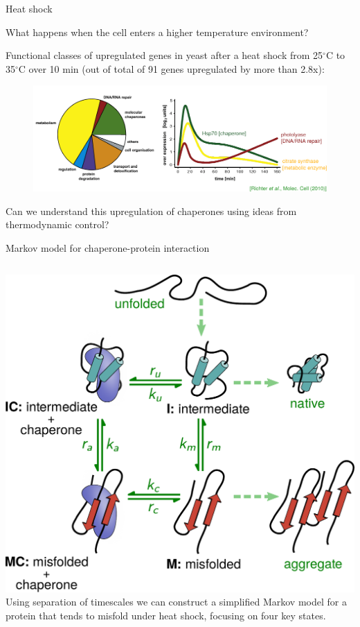 \documentclass{beamer}
\begin{document}
\begin{frame}{Heat shock}

  {What happens when the cell enters a higher temperature environment?\\[1em]}

  \pause

{\small  Functional classes of upregulated genes in yeast after a heat shock from 25$^\circ$C to 35$^\circ$C over 10 min (out of total of 91 genes upregulated by more than 2.8x):}
  \vspace{1em}
  \begin{figure}
    \includegraphics[width=\textwidth]{yeast_response.pdf}
  \end{figure}

  \pause

\alert{\small Can we understand this upregulation of chaperones using ideas from thermodynamic control?}

\end{frame}

\begin{frame}{Markov model for chaperone-protein interaction}

  \begin{columns}
    \includegraphics[width=\textwidth]{markov0.pdf}
     Using separation of timescales we can
    construct a simplified {\color{blue} Markov model} for a protein that tends to
    misfold under heat shock, focusing on four key states.
    \end{columns}
\end{frame}
\end{document}
